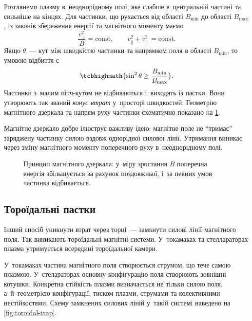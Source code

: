 Розглянемо плазму в~неоднорідному полі, яке слабше в~центральній частині та сильніше на кінцях. Для частинки, що рухається від області $B_{\min}$ до області $B_{\max}$, із законів збереження енергії та магнітного моменту маємо
\begin{equation}
	\frac{v_{\perp}^2}{B}=\mathrm{const},
	\qquad
	v_\parallel^2+v_\perp^2=\mathrm{const}.
\end{equation}
Якщо $\theta$~--- кут між швидкістю частинки та напрямком поля в області $B_{\min}$, то умовою відбиття є
\begin{equation}
	\tcbhighmath{
		\sin^2\theta
		\geq
		\frac{B_{\min}}{B_{\max}}
	}.
\end{equation}
Частинки з~малим пітч-кутом не відбиваються і~виходять із пастки. Вони утворюють так званий \emph{конус втрат} у~просторі швидкостей. Геометрію магнітного дзеркала та напрям руху частинки схематично показано на \ref{fig:magnetic-mirror}.

Магнітне дзеркало добре ілюструє важливу ідею: магнітне поле не \enquote{тримає} заряджену частинку силою вздовж однорідної силової лінії. Утримання виникає через зміну магнітного моменту поперечного руху в~неоднорідному полі.

\begin{figure}[htbp]\centering
	\caption{Принцип магнітного дзеркала: у~міру зростання $B$ поперечна енергія збільшується за рахунок поздовжньої, і~за певних умов частинка відбивається.}\label{fig:magnetic-mirror}
\end{figure}

\subsection{Тороїдальні пастки}

Інший спосіб уникнути втрат через торці~--- замкнути силові лінії магнітного поля. Так виникають тороїдальні магнітні системи. У~токамаках та стеллараторах плазма утримується всередині тороїдальної камери.

У~токамаках частина магнітного поля створюється струмом, що тече самою плазмою. У~стелараторах основну конфігурацію поля створюють зовнішні котушки. Конкретна стійкість плазми визначається не тільки силою поля, а~й~геометрією конфігурації, тиском плазми, струмами та колективними нестійкостями. Схему замкнених силових ліній у~такій системі наведено на \ref{fig:toroidal-trap}.

